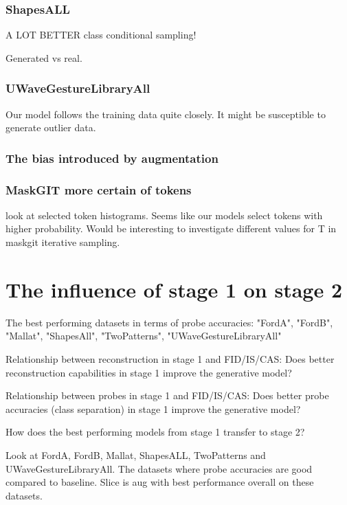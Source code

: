 \documentclass[../../thesis.tex]{subfiles}
\begin{document}
\subsubsection{ShapesALL}
A LOT BETTER class conditional sampling!

Generated vs real.



\subsubsection{UWaveGestureLibraryAll}


Our model follows the training data quite closely. It might be susceptible to generate outlier data.

\subsubsection{The bias introduced by augmentation}


\subsubsection{MaskGIT more certain of tokens}
look at selected token histograms. Seems like our models select tokens with higher probability. Would be interesting to investigate different values for T in maskgit iterative sampling.



\section{The influence of stage 1 on stage 2}
The best performing datasets in terms of probe accuracies: "FordA", "FordB", "Mallat", "ShapesAll", "TwoPatterns", "UWaveGestureLibraryAll"\newline

Relationship between reconstruction in stage 1 and FID/IS/CAS:
Does better reconstruction capabilities in stage 1 improve the generative model?\newline

Relationship between probes in stage 1 and FID/IS/CAS:
Does better probe accuracies (class separation) in stage 1 improve the generative model?\newline

How does the best performing models from stage 1 transfer to stage 2?\newline

Look at FordA, FordB, Mallat, ShapesALL, TwoPatterns and UWaveGestureLibraryAll. The datasets where probe accuracies are good compared to baseline. Slice is aug with best performance overall on these datasets. \newline
\end{document}
